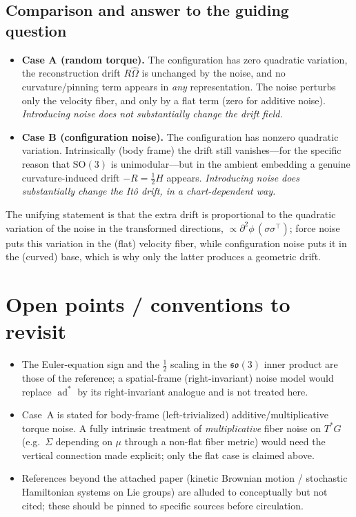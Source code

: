\documentclass[11pt]{article}
\theoremstyle{plain}
\theoremstyle{definition}
\newcommand{\so}{\mathfrak{so}(3)}
\newcommand{\SO}{\mathrm{SO}(3)}
\newcommand{\adstar}{\operatorname{ad}^{*}}
\newcommand{\Om}{\Omega}
\newcommand{\half}{\tfrac{1}{2}}
\begin{document}
\subsection{Comparison and answer to the guiding question}

\begin{itemize}[leftmargin=1.4em]
  \item \textbf{Case A (random torque).} The configuration has zero quadratic
  variation, the reconstruction drift $R\hat\Om$ is unchanged by the noise, and
  no curvature/pinning term appears in \emph{any} representation. The noise
  perturbs only the velocity fiber, and only by a flat term (zero for additive
  noise). \emph{Introducing noise does not substantially change the drift field.}

  \item \textbf{Case B (configuration noise).} The configuration has nonzero
  quadratic variation. Intrinsically (body frame) the drift still vanishes---for
  the specific reason that $\SO$ is unimodular---but in the ambient embedding a
  genuine curvature-induced drift $-R=\half H$ appears. \emph{Introducing noise
  does substantially change the It\^o drift, in a chart-dependent way.}
\end{itemize}

The unifying statement is that the extra drift is proportional to the quadratic
variation of the noise in the transformed directions,
$\propto \partial^2\phi\,(\sigma\sigma^\top)$; force noise puts this variation in
the (flat) velocity fiber, while configuration noise puts it in the (curved) base,
which is why only the latter produces a geometric drift.

\section*{Open points / conventions to revisit}
\begin{itemize}[leftmargin=1.4em]
  \item The Euler-equation sign and the $\half$ scaling in the $\so$ inner product
  are those of the reference; a spatial-frame (right-invariant) noise model would
  replace $\adstar$ by its right-invariant analogue and is not treated here.
  \item Case~A is stated for body-frame (left-trivialized) additive/multiplicative
  torque noise. A fully intrinsic treatment of \emph{multiplicative} fiber noise
  on $T^*G$ (e.g.\ $\Sigma$ depending on $\mu$ through a non-flat fiber metric)
  would need the vertical connection made explicit; only the flat case is claimed
  above.
  \item References beyond the attached paper (kinetic Brownian motion / stochastic
  Hamiltonian systems on Lie groups) are alluded to conceptually but not cited;
  these should be pinned to specific sources before circulation.
\end{itemize}
\end{document}
